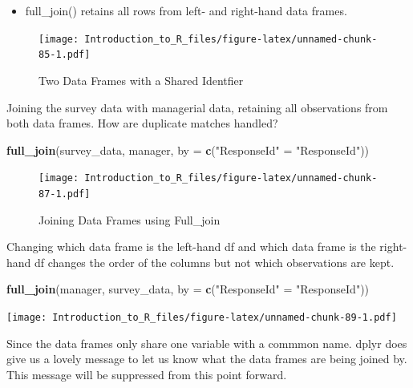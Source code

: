 \documentclass[]{book}
\newenvironment{Shaded}{\begin{snugshade}}{\end{snugshade}}
\newcommand{\DataTypeTok}[1]{\textcolor[rgb]{0.13,0.29,0.53}{#1}}
\newcommand{\KeywordTok}[1]{\textcolor[rgb]{0.13,0.29,0.53}{\textbf{#1}}}
\newcommand{\NormalTok}[1]{#1}
\newcommand{\StringTok}[1]{\textcolor[rgb]{0.31,0.60,0.02}{#1}}
\providecommand{\tightlist}{%
  \setlength{\itemsep}{0pt}\setlength{\parskip}{0pt}}
\theoremstyle{definition}
\theoremstyle{definition}
\theoremstyle{definition}
\theoremstyle{remark}
\let\BeginKnitrBlock\begin \let\EndKnitrBlock\end
\begin{document}
\begin{itemize}
\tightlist
\item
  full\_join() retains all rows from left- and right-hand data frames.
\end{itemize}

\begin{figure}
\centering
\texttt{[image: Introduction\_to\_R\_files/figure-latex/unnamed-chunk-85-1.pdf]}
\caption{\label{fig:unnamed-chunk-85}Two Data Frames with a Shared Identfier}
\end{figure}

\BeginKnitrBlock{example}
\protect\hypertarget{exm:fulljoin1}{}{\label{exm:fulljoin1} }Joining the survey data with managerial data, retaining all observations from both data frames. How are duplicate matches handled?
\EndKnitrBlock{example}

\begin{Shaded}
\begin{Highlighting}[]
\KeywordTok{full_join}\NormalTok{(survey_data, manager, }\DataTypeTok{by =} \KeywordTok{c}\NormalTok{(}\StringTok{"ResponseId"}\NormalTok{ =}\StringTok{ "ResponseId"}\NormalTok{))}
\end{Highlighting}
\end{Shaded}

\begin{figure}
\centering
\texttt{[image: Introduction\_to\_R\_files/figure-latex/unnamed-chunk-87-1.pdf]}
\caption{\label{fig:unnamed-chunk-87}Joining Data Frames using Full\_join}
\end{figure}

\BeginKnitrBlock{example}
\protect\hypertarget{exm:fulljoin2}{}{\label{exm:fulljoin2} }Changing which data frame is the left-hand df and which data frame is the right-hand df changes the order of the columns but not which observations are kept.
\EndKnitrBlock{example}

\begin{Shaded}
\begin{Highlighting}[]
\KeywordTok{full_join}\NormalTok{(manager, survey_data, }\DataTypeTok{by =} \KeywordTok{c}\NormalTok{(}\StringTok{"ResponseId"}\NormalTok{ =}\StringTok{ "ResponseId"}\NormalTok{))}
\end{Highlighting}
\end{Shaded}

\texttt{[image: Introduction\_to\_R\_files/figure-latex/unnamed-chunk-89-1.pdf]}

\BeginKnitrBlock{example}
\protect\hypertarget{exm:fulljoin3}{}{\label{exm:fulljoin3} }Since the data frames only share one variable with a commmon name. dplyr does give us a lovely message to let us know what the data frames are being joined by. This message will be suppressed from this point forward.
\EndKnitrBlock{example}
\end{document}
